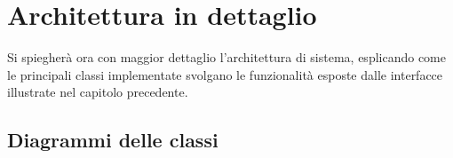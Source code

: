% 
\section{Architettura in dettaglio}
Si spiegher\`{a} ora con maggior dettaglio l'architettura di sistema, esplicando come le principali classi implementate svolgano le funzionalit\`{a}
esposte dalle interfacce illustrate nel capitolo precedente.
\subsection{Diagrammi delle classi}
